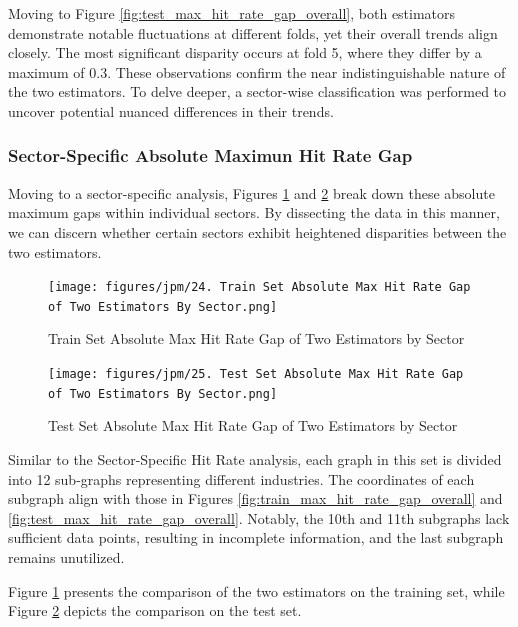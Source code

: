 Moving to Figure \ref{fig:test_max_hit_rate_gap_overall}, both estimators demonstrate notable fluctuations at different folds, yet their overall trends align closely. The most significant disparity occurs at fold 5, where they differ by a maximum of 0.3. These observations confirm the near indistinguishable nature of the two estimators. To delve deeper, a sector-wise classification was performed to uncover potential nuanced differences in their trends.

\subsubsection{Sector-Specific Absolute Maximun Hit Rate Gap}
Moving to a sector-specific analysis, Figures \ref{fig:train_max_hit_rate_gap_sector} and \ref{fig:test_max_hit_rate_gap_sector} break down these absolute maximum gaps within individual sectors. By dissecting the data in this manner, we can discern whether certain sectors exhibit heightened disparities between the two estimators.

\begin{figure}[H]
    \centering
    \texttt{[image: figures/jpm/24. Train Set Absolute Max Hit Rate Gap of Two Estimators By Sector.png]}
    \caption{Train Set Absolute Max Hit Rate Gap of Two Estimators by Sector}
    \label{fig:train_max_hit_rate_gap_sector}
\end{figure}

\begin{figure}[H]
    \centering
    \texttt{[image: figures/jpm/25. Test Set Absolute Max Hit Rate Gap of Two Estimators By Sector.png]}
    \caption{Test Set Absolute Max Hit Rate Gap of Two Estimators by Sector}
    \label{fig:test_max_hit_rate_gap_sector}
\end{figure}

Similar to the Sector-Specific Hit Rate analysis, each graph in this set is divided into 12 sub-graphs representing different industries. The coordinates of each subgraph align with those in Figures \ref{fig:train_max_hit_rate_gap_overall} and \ref{fig:test_max_hit_rate_gap_overall}. Notably, the 10th and 11th subgraphs lack sufficient data points, resulting in incomplete information, and the last subgraph remains unutilized.

Figure \ref{fig:train_max_hit_rate_gap_sector} presents the comparison of the two estimators on the training set, while Figure \ref{fig:test_max_hit_rate_gap_sector} depicts the comparison on the test set.


